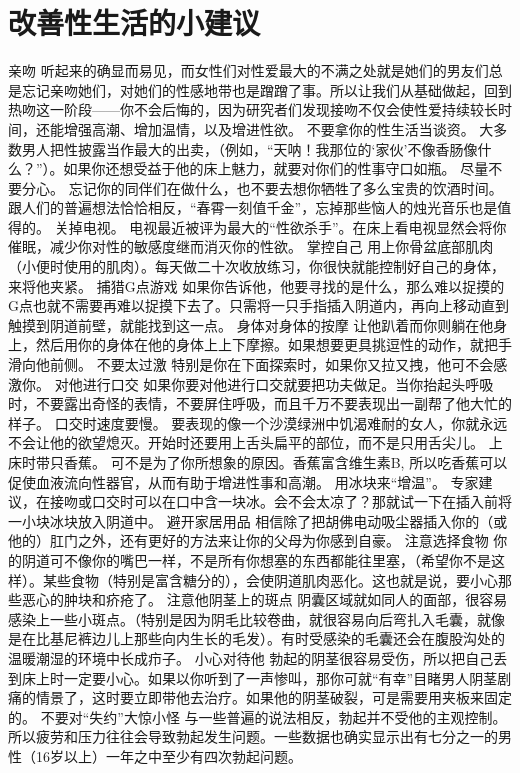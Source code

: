 \documentclass[12pt,UTF8,openany]{ctexbook}
\begin{document}
\section{改善性生活的小建议}
亲吻
听起来的确显而易见，而女性们对性爱最大的不满之处就是她们的男友们总是忘记亲吻她们，对她们的性感地带也是蹭蹭了事。所以让我们从基础做起，回到热吻这一阶段——你不会后悔的，因为研究者们发现接吻不仅会使性爱持续较长时间，还能增强高潮、增加温情，以及增进性欲。
不要拿你的性生活当谈资。
大多数男人把性披露当作最大的出卖，（例如，“天呐！我那位的‘家伙’不像香肠像什么？”）。如果你还想受益于他的床上魅力，就要对你们的性事守口如瓶。
尽量不要分心。
忘记你的同伴们在做什么，也不要去想你牺牲了多么宝贵的饮酒时间。跟人们的普遍想法恰恰相反，“春霄一刻值千金”，忘掉那些恼人的烛光音乐也是值得的。
关掉电视。
电视最近被评为最大的“性欲杀手”。在床上看电视显然会将你催眠，减少你对性的敏感度继而消灭你的性欲。
掌控自己
用上你骨盆底部肌肉（小便时使用的肌肉）。每天做二十次收放练习，你很快就能控制好自己的身体，来将他夹紧。
捕猎G点游戏
如果你告诉他，他要寻找的是什么，那么难以捉摸的G点也就不需要再难以捉摸下去了。只需将一只手指插入阴道内，再向上移动直到触摸到阴道前壁，就能找到这一点。
身体对身体的按摩
让他趴着而你则躺在他身上，然后用你的身体在他的身体上上下摩擦。如果想要更具挑逗性的动作，就把手滑向他前侧。
不要太过激
特别是你在下面探索时，如果你又拉又拽，他可不会感激你。
对他进行口交
如果你要对他进行口交就要把功夫做足。当你抬起头呼吸时，不要露出奇怪的表情，不要屏住呼吸，而且千万不要表现出一副帮了他大忙的样子。
口交时速度要慢。
要表现的像一个沙漠绿洲中饥渴难耐的女人，你就永远不会让他的欲望熄灭。开始时还要用上舌头扁平的部位，而不是只用舌尖儿。
上床时带只香蕉。
可不是为了你所想象的原因。香蕉富含维生素B, 所以吃香蕉可以促使血液流向性器官，从而有助于增进性事和高潮。
用冰块来“增温”。
专家建议，在接吻或口交时可以在口中含一块冰。会不会太凉了？那就试一下在插入前将一小块冰块放入阴道中。
避开家居用品
相信除了把胡佛电动吸尘器插入你的（或他的）肛门之外，还有更好的方法来让你的父母为你感到自豪。
注意选择食物
你的阴道可不像你的嘴巴一样，不是所有你想塞的东西都能往里塞，（希望你不是这样）。某些食物（特别是富含糖分的），会使阴道肌肉恶化。这也就是说，要小心那些恶心的肿块和疥疮了。
注意他阴茎上的斑点
阴囊区域就如同人的面部，很容易感染上一些小斑点。（特别是因为阴毛比较卷曲，就很容易向后弯扎入毛囊，就像是在比基尼裤边儿上那些向内生长的毛发）。有时受感染的毛囊还会在腹股沟处的温暖潮湿的环境中长成疖子。
小心对待他
勃起的阴茎很容易受伤，所以把自己丢到床上时一定要小心。如果以你听到了一声惨叫，那你可就“有幸”目睹男人阴茎剧痛的情景了，这时要立即带他去治疗。如果他的阴茎破裂，可是需要用夹板来固定的。
不要对“失约”大惊小怪
与一些普遍的说法相反，勃起并不受他的主观控制。所以疲劳和压力往往会导致勃起发生问题。一些数据也确实显示出有七分之一的男性（16岁以上）一年之中至少有四次勃起问题。
\end{document}
